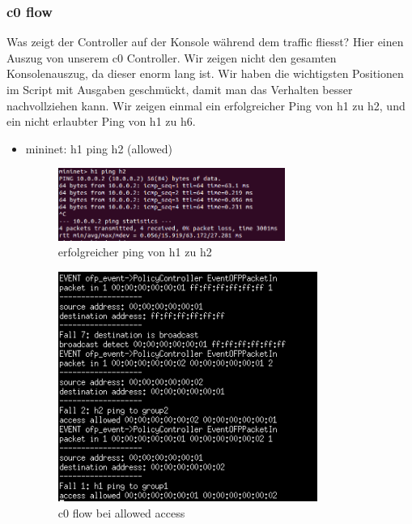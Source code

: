 \documentclass[a4,12pt]{scrartcl}
\begin{document}
\subsubsection{c0 flow}
Was zeigt der Controller auf der Konsole während dem traffic fliesst? Hier einen Auszug von unserem c0 Controller. Wir zeigen nicht den gesamten Konsolenauszug, da dieser enorm lang ist. Wir haben die wichtigsten Positionen im Script mit Ausgaben geschmückt, damit man das Verhalten besser nachvollziehen kann. Wir zeigen einmal ein erfolgreicher Ping von h1 zu h2, und ein nicht erlaubter Ping von h1 zu h6. 
\begin{itemize}
\item mininet: h1 ping h2 (allowed)
\begin{figure} [H]
	\begin{center}
	\includegraphics[width=0.70\textwidth]{./pictures/h1_ping_h2_ok.png}
	\caption{erfolgreicher ping von h1 zu h2}
	\label{x}
	\end{center}
\end{figure} 
\begin{figure} [H]
	\begin{center}
	\includegraphics[width=0.80\textwidth]{./pictures/h1_ping_h2.png}
	\caption{c0 flow bei allowed access}
	\label{x}
	\end{center}
\end{figure} 

\end{itemize}
\end{document}
